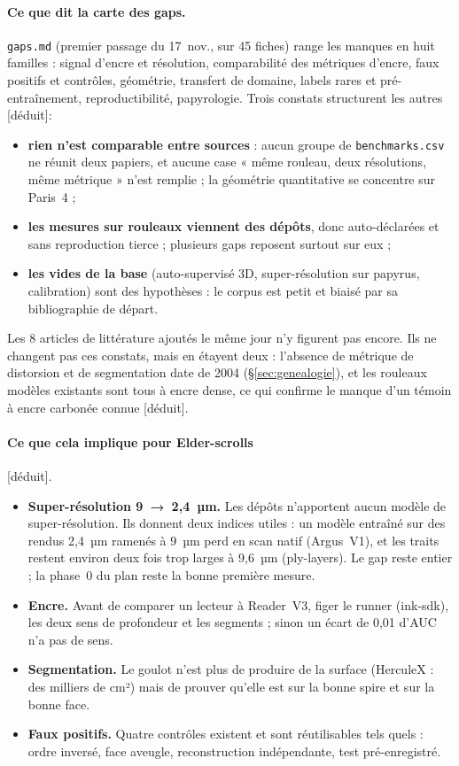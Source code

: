 \documentclass[11pt,a4paper]{article}
\newcommand{\deduit}{\textsf{\small[déduit]}}
\begin{document}
\paragraph{Ce que dit la carte des gaps.} \nolinkurl{gaps.md} (premier passage du 17~nov., sur
45 fiches) range les manques en huit familles : signal d'encre et résolution, comparabilité
des métriques d'encre, faux positifs et contrôles, géométrie, transfert de domaine, labels
rares et pré-entraînement, reproductibilité, papyrologie. Trois constats structurent les
autres \deduit :
\begin{itemize}
  \item \textbf{rien n'est comparable entre sources} : aucun groupe de \texttt{benchmarks.csv}
  ne réunit deux papiers, et aucune case « même rouleau, deux résolutions, même métrique »
  n'est remplie ; la géométrie quantitative se concentre sur Paris~4 ;
  \item \textbf{les mesures sur rouleaux viennent des dépôts}, donc auto-déclarées et sans
  reproduction tierce ; plusieurs gaps reposent surtout sur eux ;
  \item \textbf{les vides de la base} (auto-supervisé 3D, super-résolution sur papyrus,
  calibration) sont des hypothèses : le corpus est petit et biaisé par sa bibliographie de
  départ.
\end{itemize}
Les 8 articles de littérature ajoutés le même jour n'y figurent pas encore. Ils ne changent
pas ces constats, mais en étayent deux : l'absence de métrique de distorsion et de
segmentation date de 2004 (\S\ref{sec:genealogie}), et les rouleaux modèles existants sont
tous à encre dense, ce qui confirme le manque d'un témoin à encre carbonée connue
\deduit.

\paragraph{Ce que cela implique pour Elder-scrolls} \deduit.
\begin{itemize}
  \item \textbf{Super-résolution 9~→~2,4~µm.} Les dépôts n'apportent aucun modèle de
  super-résolution. Ils donnent deux indices utiles : un modèle entraîné sur des rendus
  2,4~µm ramenés à 9~µm perd en scan natif (Argus~V1), et les traits restent environ deux
  fois trop larges à 9,6~µm (ply-layers). Le gap reste entier ; la phase~0 du plan reste la
  bonne première mesure.
  \item \textbf{Encre.} Avant de comparer un lecteur à Reader~V3, figer le runner (ink-sdk),
  les deux sens de profondeur et les segments ; sinon un écart de 0,01 d'AUC n'a pas de sens.
  \item \textbf{Segmentation.} Le goulot n'est plus de produire de la surface (HerculeX : des
  milliers de cm²) mais de prouver qu'elle est sur la bonne spire et sur la bonne face.
  \item \textbf{Faux positifs.} Quatre contrôles existent et sont réutilisables tels quels :
  ordre inversé, face aveugle, reconstruction indépendante, test pré-enregistré.
\end{itemize}
\end{document}
